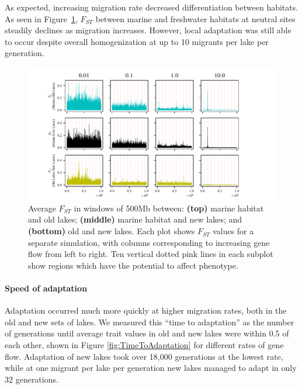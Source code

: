 \documentclass{article}
\begin{document}
As expected, increasing migration rate decreased differentiation between habitats. 
As seen in Figure~\ref{fig:Fst}, 
$F_{ST}$ between marine and freshwater habitats 
at neutral sites steadily declines as migration increases. 
However, local adaptation was still able to occur despite overall homogenization 
at up to 10 migrants per lake per generation.

\begin{figure}
	\begin{center}
        \includegraphics[width=\textwidth]{Final_Plots/Fst_Genome.pdf}
  		\caption{
		Average $F_{ST}$ in windows of 500Mb between:
        		\textbf{(top)} marine habitat and old lakes;
        		\textbf{(middle)} marine habitat and new lakes; and
        		\textbf{(bottom)} old and new lakes.
        		Each plot shows $F_{ST}$ values for a separate simulation,
        		with columns corresponding to increasing gene flow from left to right.
		Ten vertical dotted pink lines in each subplot 
        		show regions which have the potential to affect phenotype.
     } \label{fig:Fst}
	\end{center}
\end{figure}

\paragraph*{Speed of adaptation}
Adaptation occurred much more quickly
at higher migration rates,
both in the old and new sets of lakes.
We measured this ``time to adaptation''
as the number of generations until 
average trait values in old and new lakes were within 0.5 of each other,
shown in Figure \ref{fig:TimeToAdaptation} for different rates of gene flow.
Adaptation of new lakes took over 18,000 generations at the lowest rate,
while at one migrant per lake per generation
new lakes managed to adapt in only 32 generations. 
\end{document}
